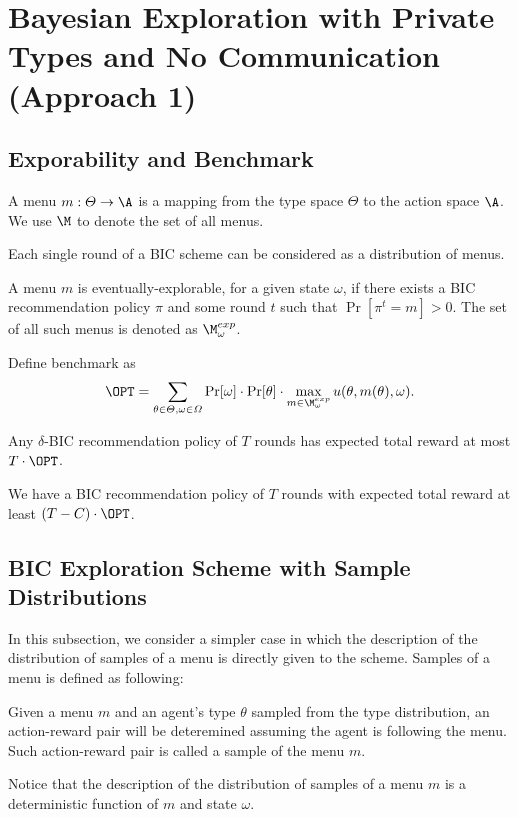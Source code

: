 
\section{Bayesian Exploration with Private Types and No Communication (Approach 1)}



\subsection{Exporability and Benchmark}

\begin{definition}
A menu $m: \varTheta \rightarrow \A$ is a mapping from the type space $\varTheta$ to the action space $\A$. We use $\M$ to denote the set of all menus.
\end{definition}

\begin{claim}
Each single round of a BIC scheme can be considered as a distribution of menus.
\end{claim}

\begin{definition}
A menu $m$ is eventually-explorable, for a given state $\omega$, if there exists a BIC recommendation policy $\pi$ and some round $t$ such that $\Pr[\pi^t= m]> 0$. The set of all such menus is denoted as $\M_{\omega}^{exp}$.
\end{definition}

\begin{definition}[Benchmark]
Define benchmark as 
\[
\OPT = \sum_{\theta \in \varTheta, \omega\in \varOmega} \Pr[\omega] \cdot \Pr[\theta] \cdot \max_{m \in \M_{\omega}^{exp}} u(\theta, m(\theta), \omega).
\]
\end{definition}

\begin{claim}
Any $\delta$-BIC recommendation policy of $T$ rounds has expected total reward at most $T \cdot\OPT$.  
\end{claim}

\begin{theorem}
\label{thm:private_nocc}
We have a BIC recommendation policy of $T$ rounds with expected total reward at least $\left(T - C \right) \cdot \OPT$. 
\end{theorem}

\subsection{BIC Exploration Scheme with Sample Distributions}
In this subsection, we consider a simpler case in which the description of the distribution of samples of a menu is directly given to the scheme. Samples of a menu is defined as following: 
\begin{definition}
Given a menu $m$ and an agent's type $\theta$ sampled from the type distribution, an action-reward pair will be deteremined assuming the agent is following the menu. Such action-reward pair is called a sample of the menu $m$. 
\end{definition}
Notice that the description of the distribution of samples of a menu $m$ is a deterministic function of $m$ and state $\omega$. 

